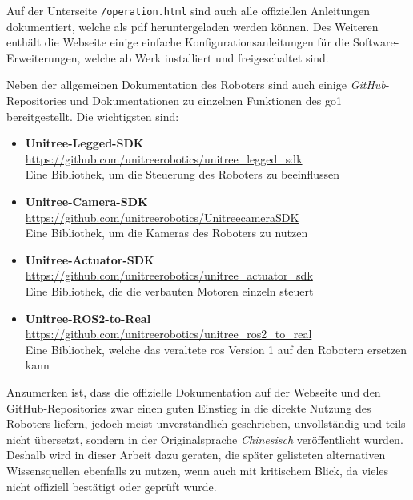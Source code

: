 Auf der Unterseite \texttt{/operation.html} sind auch alle offiziellen Anleitungen dokumentiert, welche als \gls{pdf} heruntergeladen
werden können.
Des Weiteren enthält die Webseite einige einfache Konfigurationsanleitungen für die Software-Erweiterungen, welche ab
Werk installiert und freigeschaltet sind.

Neben der allgemeinen Dokumentation des Roboters sind auch einige \emph{GitHub}-Repositories und Dokumentationen zu einzelnen
Funktionen des \gls{go1} bereitgestellt.
Die wichtigsten sind:

\begin{itemize}
    \item \textbf{Unitree-Legged-SDK}\\
    \url{https://github.com/unitreerobotics/unitree\_legged\_sdk}\\
    \textrightarrow{} Eine Bibliothek, um die Steuerung des Roboters zu beeinflussen
    \item \textbf{Unitree-Camera-SDK}\\
    \url{https://github.com/unitreerobotics/UnitreecameraSDK}\\
    \textrightarrow{} Eine Bibliothek, um die Kameras des Roboters zu nutzen
    \item \textbf{Unitree-Actuator-SDK}\\
    \url{https://github.com/unitreerobotics/unitree\_actuator\_sdk}\\
    \textrightarrow{} Eine Bibliothek, die die verbauten Motoren einzeln steuert
    \item \textbf{Unitree-ROS2-to-Real}\\
    \url{https://github.com/unitreerobotics/unitree\_ros2\_to\_real}\\
    \textrightarrow{} Eine Bibliothek, welche das veraltete \gls{ros} Version 1 auf den Robotern ersetzen kann
\end{itemize}

Anzumerken ist, dass die offizielle Dokumentation auf der Webseite und den GitHub-Repositories zwar einen guten Einstieg
in die direkte Nutzung des Roboters liefern, jedoch meist unverständlich geschrieben, unvollständig und teils nicht übersetzt,
sondern in der Originalsprache \emph{Chinesisch} veröffentlicht wurden.
Deshalb wird in dieser Arbeit dazu geraten, die später gelisteten alternativen Wissensquellen ebenfalls zu nutzen, wenn auch mit kritischem Blick,
da vieles nicht offiziell bestätigt oder geprüft wurde.


